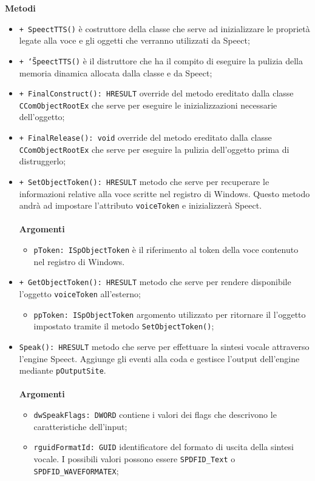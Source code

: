\textbf{Metodi}
\begin{itemize}
	\item \texttt{+ SpeectTTS()} è costruttore della classe che serve ad inizializzare le proprietà legate alla voce e gli oggetti che verranno utilizzati da Speect;
	\item \texttt{+ \char`\~SpeectTTS()} è il distruttore che ha il compito di eseguire la pulizia della memoria dinamica allocata dalla classe e da Speect; 
	\item \texttt{+ FinalConstruct(): HRESULT} override del metodo ereditato dalla classe \texttt{CComObjectRootEx} che serve per eseguire le inizializzazioni necessarie dell'oggetto;
	\item \texttt{+ FinalRelease(): void} override del metodo ereditato dalla classe \texttt{CComObjectRootEx} che serve per eseguire la pulizia dell'oggetto prima di distruggerlo;
	\item \texttt{+ SetObjectToken(): HRESULT} metodo che serve per recuperare le informazioni relative alla voce scritte nel registro di Windows. Questo metodo andrà ad impostare l'attributo \texttt{voiceToken} e inizializzerà Speect.\\\\
	\textbf{Argomenti}
	\begin{itemize}
		\item \texttt{pToken: ISpObjectToken} è il riferimento al token della voce contenuto nel registro di Windows. 
	\end{itemize}
	\item \texttt{+ GetObjectToken(): HRESULT} metodo che serve per rendere disponibile l'oggetto \texttt{voiceToken} all'esterno;
	\begin{itemize}
		\item \texttt{ppToken: ISpObjectToken} argomento utilizzato per ritornare il l'oggetto impostato tramite il metodo \texttt{SetObjectToken()};
	\end{itemize}
	\item \texttt{Speak(): HRESULT} metodo che serve per effettuare la sintesi vocale attraverso l'engine Speect. Aggiunge gli eventi alla coda e gestisce l'output dell'engine mediante \texttt{pOutputSite}.\\\\
	\textbf{Argomenti}
	\begin{itemize}
		\item \texttt{dwSpeakFlags: DWORD} contiene i valori dei flags che descrivono le caratteristiche dell'input;
		\item \texttt{rguidFormatId: GUID} identificatore del formato di uscita della sintesi vocale. I possibili valori possono essere \texttt{SPDFID\_Text} o \texttt{SPDFID\_WAVEFORMATEX};

\end{itemize}
\end{itemize}
